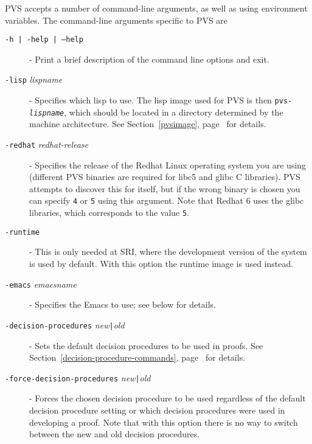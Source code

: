 PVS accepts a number of command-line arguments, as well as using environment
variables.  The command-line arguments specific to PVS are
\begin{description}

\item[\texttt{-h | -help | --help}] - Print a brief description of the command line options and
exit.

\item[\texttt{-lisp} \emph{lispname}] - Specifies which lisp to use. The lisp image used for PVS
is then \texttt{pvs-\emph{lispname}}, which should be located in a
directory determined by the machine architecture.  See
Section~\ref{pvsimage}, page~\pageref{pvsimage} for details.

\label{dash-redhat}
\item[\texttt{-redhat}
\emph{redhat-release}] - Specifies the release of the Redhat Linux operating system you
are using (different PVS binaries are required for libc5 and glibc C
libraries).  PVS attempts to discover this for itself, but if the wrong
binary is chosen you can specify \texttt{4} or \texttt{5} using this
argument.  Note that Redhat 6 uses the glibc libraries, which corresponds
to the value \texttt{5}.

\item[\texttt{-runtime}] - This is only needed at SRI, where the development version of
the system is used by default.  With this option the runtime image is used
instead.

\item[\texttt{-emacs} \emph{emacsname}] - Specifies the Emacs to use; see below for
details.

\item[\texttt{-decision-procedures}
\emph{new}\texttt{|}\emph{old}] - Sets the default decision procedures to be used
in proofs.  See Section~\ref{decision-procedure-commands},
page~\pageref{decision-procedure-commands} for details.

\item[\texttt{-force-decision-procedures}
\emph{new}\texttt{|}\emph{old}] - Forces the chosen decision procedure to be used
regardless of the default decision procedure setting or which decision
procedures were used in developing a proof.  Note that with this option
there is no way to switch between the new and old decision procedures.


\end{description}
